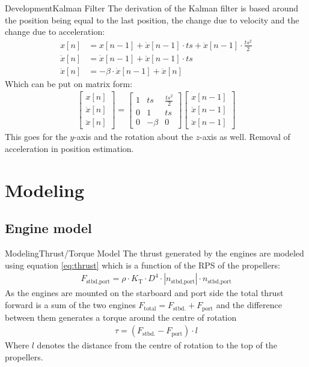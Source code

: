 \documentclass[10pt]{beamer}
\begin{document}
\begin{frame}{Development}{Kalman Filter}
The derivation of the Kalman filter is based around the position being equal to the last position, the change due to velocity and the change due to acceleration:
\begin{align}
x[n] &= x[n-1] + \dot{x}[n-1]\cdot ts + \ddot{x}[n-1]\cdot \frac{ts^2}{2}\\
\dot{x}[n] &= \dot{x}[n-1] + \ddot{x}[n-1] \cdot ts\\
\ddot{x}[n] &= -\beta \cdot \dot{x}[n-1] + \ddot{x}[n]
\end{align}
Which can be put on matrix form:
\begin{align}
\begin{bmatrix}
x[n]\\
\dot{x}[n]\\
\ddot{x}[n]
\end{bmatrix} = \begin{bmatrix}
1 & ts & \frac{ts^2}{2}\\
0 & 1 & ts\\
0 & -\beta & 0
\end{bmatrix}\begin{bmatrix}
x[n-1]\\
\dot{x}[n-1]\\
\ddot{x}[n-1]
\end{bmatrix}
\end{align}
This goes for the $y$-axis and the rotation about the $z$-axis as well. Removal of acceleration in position estimation.
\end{frame}


\section{Modeling}
\subsection{Engine model}
\begin{frame}{Modeling}{Thrust/Torque Model}
The thrust generated by the engines are modeled using equation \ref{eq:thrust} which is a function of the RPS of the propellers:
\begin{align}
F_\text{stbd,port} = \rho \cdot K_\text{T} \cdot D^4 \cdot |n_\text{stbd,port}| \cdot n_\text{stbd,port}
\label{eq:thrust}
\end{align}
As the engines are mounted on the starboard and port side the total thrust forward is a sum of the two engines $F_\text{total} = F_\text{stbd.} + F_\text{port}$ and the difference between them generates a torque around the centre of rotation
\begin{align}
\tau = (F_\text{stbd.} - F_\text{port}) \cdot l
\end{align}
Where $l$ denotes the distance from the centre of rotation to the top of the propellers.
\end{frame}
\end{document}
